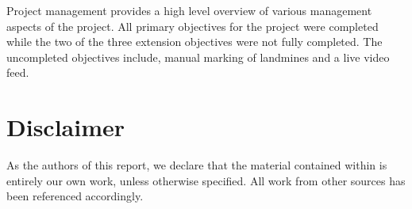 \documentclass[main.tex]{subfiles}
\begin{document}
Project management provides a high level overview of various management aspects of the project. All primary objectives for the project were completed while the two of the three extension objectives were not fully completed. The uncompleted objectives include, manual marking of landmines and a live video feed. 

 






\newpage
{}
{}	%
\chapter*{Disclaimer}
As the authors of this report, we declare that the material contained within is entirely our own work, unless otherwise specified. All work from other sources has been referenced accordingly. 
\vspace{0.4in}
\end{document}
